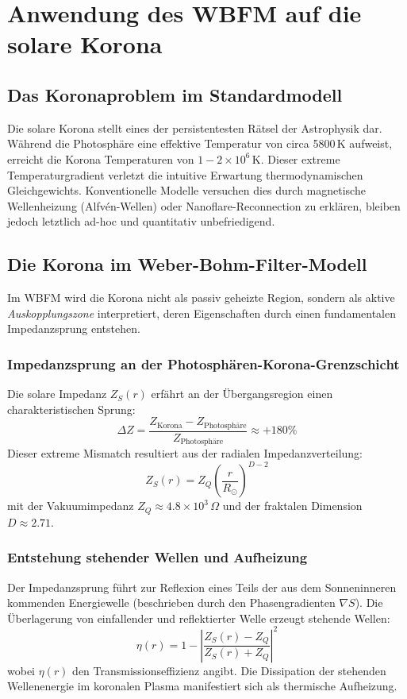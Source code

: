 \chapter{Anwendung des WBFM auf die solare Korona}

\section{Das Koronaproblem im Standardmodell}
Die solare Korona stellt eines der persistentesten Rätsel der Astrophysik dar. Während die Photosphäre eine effektive Temperatur von circa 5800\,K aufweist, erreicht die
Korona Temperaturen von $1-2\times 10^6$\,K. Dieser extreme Temperaturgradient verletzt die intuitive Erwartung thermodynamischen Gleichgewichts. Konventionelle Modelle
versuchen dies durch magnetische Wellenheizung (Alfvén-Wellen) oder Nanoflare-Reconnection zu erklären, bleiben jedoch letztlich ad-hoc und quantitativ unbefriedigend.

\section{Die Korona im Weber-Bohm-Filter-Modell}
Im WBFM wird die Korona nicht als passiv geheizte Region, sondern als aktive \textit{Auskopplungszone} interpretiert, deren Eigenschaften durch einen fundamentalen
Impedanzsprung entstehen.

\subsection{Impedanzsprung an der Photosphären-Korona-Grenzschicht}
Die solare Impedanz $Z_S(r)$ erfährt an der Übergangsregion einen charakteristischen Sprung:
\[
\Delta Z = \frac{Z_{\text{Korona}} - Z_{\text{Photosphäre}}}{Z_{\text{Photosphäre}}} \approx +180\%
\]
Dieser extreme Mismatch resultiert aus der radialen Impedanzverteilung:
\[
Z_S(r) = Z_Q \left( \frac{r}{R_\odot} \right)^{D-2}
\]
mit der Vakuumimpedanz $Z_Q \approx 4.8\times 10^3\,\Omega$ und der fraktalen Dimension $D \approx 2.71$.

\subsection{Entstehung stehender Wellen und Aufheizung}
Der Impedanzsprung führt zur Reflexion eines Teils der aus dem Sonneninneren kommenden Energiewelle (beschrieben durch den Phasengradienten $\nabla S$). Die Überlagerung von einfallender und reflektierter Welle erzeugt stehende Wellen:
\[
\eta(r) = 1 - \left| \frac{Z_S(r) - Z_Q}{Z_S(r) + Z_Q} \right|^2
\]
wobei $\eta(r)$ den Transmissionseffizienz angibt. Die Dissipation der stehenden Wellenenergie im koronalen Plasma manifestiert sich als thermische Aufheizung.

